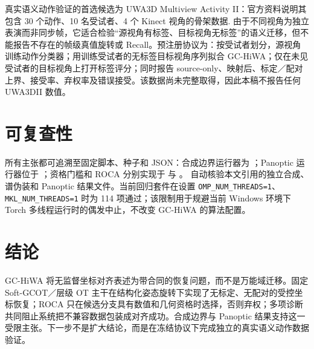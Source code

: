 \documentclass[UTF8,a4paper,11pt]{ctexart}
\theoremstyle{definition}
\theoremstyle{remark}
\begin{document}
真实语义动作验证的首选候选为 UWA3D Multiview Activity II：官方资料说明其包含 30 个动作、10 名受试者、4 个 Kinect 视角的骨架数据\cite{uwa3dii}. 由于不同视角为独立表演而非同步帧，它适合检验“源视角有标签、目标视角无标签”的语义迁移，但不能报告不存在的帧级真值旋转或 Recall。预注册协议为：按受试者划分，源视角训练动作分类器；用训练受试者的无标签目标视角序列拟合 GC-HiWA；仅在未见受试者的目标视角上打开标签评分；同时报告 source-only、映射后、标定／配对上界、接受率、弃权率及错误接受。该数据尚未完整取得，因此本稿不报告任何 UWA3DII 数值。

\section{可复查性}\label{sec:reproducibility}
所有主张都可追溯至固定脚本、种子和 JSON：合成边界运行器为 ；Panoptic 运行器位于 ；资格门槛和 ROCA 分别实现于  与 。 自动核验本文引用的独立合成、谱伪装和 Panoptic 结果文件。当前回归套件在设置 \texttt{OMP\_NUM\_THREADS=1}、\texttt{MKL\_NUM\_THREADS=1} 时为 114 项通过；该限制用于规避当前 Windows 环境下 Torch 多线程运行时的偶发中止，不改变 GC-HiWA 的算法配置。

\section{结论}
GC-HiWA 将无监督坐标对齐表述为带合同的恢复问题，而不是万能域迁移。固定 Soft-GCOT／层级 OT 主干在结构化姿态旋转下实现了无标定、无配对的受控坐标恢复；ROCA 只在候选分支具有数值和几何资格时选择，否则弃权；多项诊断共同阻止系统把不兼容数据包装成对齐成功。合成边界与 Panoptic 结果支持这一受限主张。下一步不是扩大结论，而是在冻结协议下完成独立的真实语义动作数据验证。


\begingroup
\small
\setlength{\parskip}{0pt}

\endgroup
\end{document}
